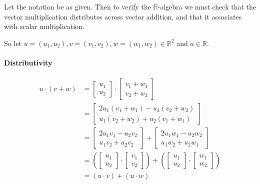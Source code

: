 \documentclass{article}
\begin{document}
\begin{solution}
Let the notation be as given. Then to verify the $\mathbb{R}$-algebra we must check that the vector multiplication distributes across vector addition, and that it associates with scalar multiplication.

So let $u=(u_{1},u_{2}),v=(v_{1},v_{2}),w=(w_{1},w_{2}) \in \mathbb{R}^{2}$ and $a \in \mathbb{R}$.

\paragraph{Distributivity}
\begin{align*}
u\cdot(v+w) &=
\begin{bmatrix}
u_{1}	\\
u_{2}
\end{bmatrix}
\cdot
\begin{bmatrix}
v_{1}+w_{1}	\\
v_{2}+w_{2}
\end{bmatrix}
\\
&=
\begin{bmatrix}
2u_{1}(v_{1}+w_{1}) - u_{2}(v_{2}+w_{2})	\\
u_{1}(v_{2}+w_{2}) + u_{2}(v_{1}+w_{1})
\end{bmatrix}
\\
&=
\begin{bmatrix}
2u_{1}v_{1} - u_{2}v_{2}	\\
u_{1}v_{2} + u_{2}v_{2}
\end{bmatrix}
+
\begin{bmatrix}
2u_{1}w_{1} - u_{2}w_{2}	\\
u_{1}w_{2} + u_{2}w_{1}
\end{bmatrix}
\\
&=
\left(
\begin{bmatrix}
u_{1}	\\
u_{2}
\end{bmatrix}
\cdot
\begin{bmatrix}
v_{1}	\\
v_{2}
\end{bmatrix}
\right)
+
\left(
\begin{bmatrix}
u_{1}	\\
u_{2}
\end{bmatrix}
\cdot
\begin{bmatrix}
w_{1}	\\
w_{2}
\end{bmatrix}
\right)
\\
&= (u\cdot v)+(u\cdot w)
\end{align*}


\end{solution}
\end{document}
